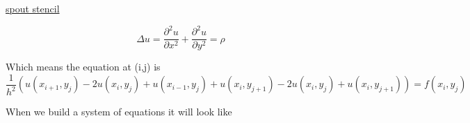\documentclass[10pt]{article}
\newcommand{\1}{\mathbb{1}}
\renewcommand{\part}{\partial}
\begin{document}
\underline{spout stencil}

\[\Delta u = \frac{\part^2 u}{\part x^2} + \frac{\part^2 u}{\part y^2} = \rho \]

Which means the equation at (i,j) is 
\[\frac{1}{h^2} (u(x_{i+1}, y_j) -2u(x_{i}, y_j) + u(x_{i-1}, y_j) + u(x_{i}, y_{j+1}) - 2u(x_{i}, y_j) + u(x_{i}, y_{j+1})) = f(x_i,y_j)\]

When we build a system of equations it will look like
\end{document}
